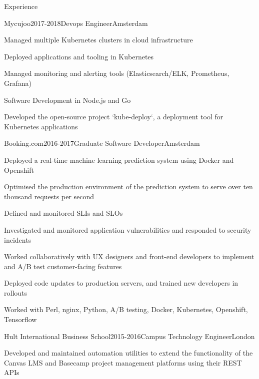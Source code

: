 \documentclass{resume} %
\begin{document}
\begin{rSection}{Experience}

\begin{rSubsection}{{Mycujoo}}{2017-2018}{Devops Engineer}{Amsterdam}
    \item Managed multiple Kubernetes clusters in cloud infrastructure
    \item Deployed applications and tooling in Kubernetes
    \item Managed monitoring and alerting tools (Elasticsearch/ELK, Prometheus, Grafana)
    \item Software Development in Node.js and Go
    \item Developed the open-source project `kube-deploy`, a deployment tool for Kubernetes applications
\end{rSubsection}


\begin{rSubsection}{{Booking.com}}{2016-2017}{Graduate Software Developer}{Amsterdam}
    \item Deployed a real-time machine learning prediction system using Docker and Openshift
    \item Optimised the production environment of the prediction system to serve over ten thousand requests per second
    \item Defined and monitored SLIs and SLOs
    \item Investigated and monitored application vulnerabilities and responded to security incidents
    \item Worked collaboratively with UX designers and front-end developers to implement and A/B test customer-facing features
    \item Deployed code updates to production servers, and trained new developers in rollouts
    \item Worked with Perl, nginx, Python, A/B testing, Docker, Kubernetes, Openshift, Tensorflow
\end{rSubsection}

\begin{rSubsection}{{Hult International Business School}}{2015-2016}{Campus Technology Engineer}{London}
    \item Developed and maintained automation utilities to extend the functionality of the Canvas LMS and Basecamp project management platforms using their REST APIs
\end{rSubsection}

\end{rSection}
\end{document}
